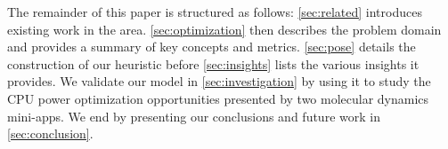 The remainder of this paper is structured as follows: \autoref{sec:related} introduces existing work in the area. 
\autoref{sec:optimization} then describes the problem domain and provides a summary of key concepts and metrics.
\autoref{sec:pose} details the construction of our heuristic before \autoref{sec:insights} lists the various insights it provides.
We validate our model in \autoref{sec:investigation} by using it to study the CPU power optimization opportunities presented by two molecular dynamics mini-apps. 
We end by presenting our conclusions and future work in \autoref{sec:conclusion}.
